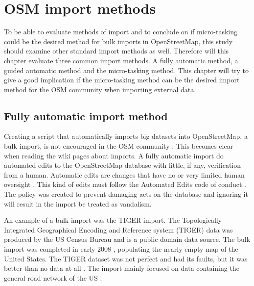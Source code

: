 \chapter{OSM import methods}\label{ch:importmethods}
To be able to evaluate methods of import and to conclude on if micro-tasking could be the desired method for bulk imports in OpenStreetMap, this study should examine other standard import methods as well. Therefore will this chapter evaluate three common import methods. A fully automatic method, a guided automatic method and the micro-tasking method. This chapter will try to give a good implication if the micro-tasking method can be the desired import method for the OSM community when importing external data.   

\section{Fully automatic import method}
Creating a script that automatically imports big datasets into OpenStreetMap, a bulk import, is not encouraged in the OSM community \cite{Zielstra2013}. This becomes clear when reading the wiki pages about imports. A fully automatic import do automated edits to the OpenStreetMap database with little, if any, verification from a human. Automatic edits are changes that have no or very limited human oversight \cite{OSMAutiEdit}. This kind of edits must follow the Automated Edits code of conduct \cite{OSMAutomaticEdits}. The policy was created to prevent damaging acts on the database and ignoring it will result in the import be treated as vandalism. 

An example of a bulk import was the TIGER import. The Topologically Integrated Geographical Encoding and Reference system (TIGER) data was produced by the US Census Bureau and is a public domain data source. The bulk import was completed in early 2008 \cite{Zielstra2013}, populating the nearly empty map of the United States. The TIGER dataset was not perfect and had its faults, but it was better than no data at all \cite{Willis2008}. The import mainly focused on data containing the general road network of the US \cite{Zielstra2013}. 

